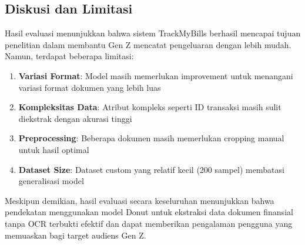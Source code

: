 \subsection{Diskusi dan Limitasi}
Hasil evaluasi menunjukkan bahwa sistem TrackMyBills berhasil mencapai tujuan penelitian dalam membantu Gen Z mencatat pengeluaran dengan lebih mudah. Namun, terdapat beberapa limitasi:

\begin{enumerate}
    \item \textbf{Variasi Format}: Model masih memerlukan improvement untuk menangani variasi format dokumen yang lebih luas
    \item \textbf{Kompleksitas Data}: Atribut kompleks seperti ID transaksi masih sulit diekstrak dengan akurasi tinggi
    \item \textbf{Preprocessing}: Beberapa dokumen masih memerlukan cropping manual untuk hasil optimal
    \item \textbf{Dataset Size}: Dataset custom yang relatif kecil (200 sampel) membatasi generalisasi model
\end{enumerate}

Meskipun demikian, hasil evaluasi secara keseluruhan menunjukkan bahwa pendekatan menggunakan model Donut untuk ekstraksi data dokumen finansial tanpa OCR terbukti efektif dan dapat memberikan pengalaman pengguna yang memuaskan bagi target audiens Gen Z.